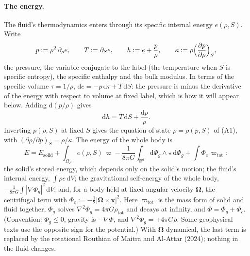 \documentclass[11pt]{article}
\theoremstyle{definition}
\theoremstyle{remark}
\newcommand{\R}{\mathbb{R}}
\newcommand{\bx}{\mathbf{x}}
\newcommand{\bOmega}{\boldsymbol{\Omega}}
\newcommand{\dV}{\,\mathrm{d}V}
\begin{document}
\paragraph{The energy.} The fluid's thermodynamics enters through its
specific internal energy $e(\rho, S)$. Write
\begin{equation}
  p := \rho^2\,\partial_\rho e,\qquad
  T := \partial_S e,\qquad
  h := e + \frac p\rho,\qquad
  \kappa := \rho\Bigl(\frac{\partial p}{\partial\rho}\Bigr)_S ,
  \label{eq:thermo}
\end{equation}
the pressure, the variable conjugate to the label (the temperature
when $S$ is specific entropy), the specific enthalpy and the bulk
modulus. In terms of the specific volume $\tau = 1/\rho$,
$\mathrm de = -p\,\mathrm d\tau + T\,\mathrm dS$: the pressure is
minus the derivative of the energy with respect to volume at fixed
label, which is how it will appear below. Adding $\mathrm d(p/\rho)$
gives
\begin{equation}
  \mathrm dh = T\,\mathrm dS + \frac{\mathrm dp}{\rho} .
  \label{eq:dh}
\end{equation}
Inverting $p(\rho, S)$ at fixed $S$ gives the equation of state $\rho
= \rho(p, S)$ of (A1), with $(\partial\rho/\partial p)_S =
\rho/\kappa$. The energy of the whole body is
\begin{equation}
  E = E_{\mathrm{solid}} + \int_{\Omega_F}e(\rho, S)\,\varpi
  - \frac{1}{8\pi G}\int_{\R^d}\mathrm d\Phi_g\wedge\star\,\mathrm d\Phi_g
  + \int\Phi_c\,\varpi_{\mathrm{tot}} :
  \label{eq:energy}
\end{equation}
the solid's stored energy, which depends only on the solid's motion;
the fluid's internal energy, $\int\rho e\dV$; the gravitational
self-energy of the whole body, $-\tfrac{1}{8\pi G}\int|\nabla\Phi_g|^2
\dV$; and, for a body held at fixed angular velocity $\bOmega$, the
centrifugal term with $\Phi_c := -\tfrac12|\bOmega\times\bx|^2$. Here
$\varpi_{\mathrm{tot}}$ is the mass form of solid and fluid together,
$\Phi_g$ solves $\nabla^2\Phi_g = 4\pi G\rho_{\mathrm{tot}}$ and decays
at infinity, and $\Phi = \Phi_g + \Phi_c$. (Convention: $\Phi_g \le 0$,
gravity is $-\nabla\Phi$, and $\nabla^2\Phi_g = +4\pi G\rho$. Some
geophysical texts use the opposite sign for the potential.) With
$\bOmega$ dynamical, the last term is replaced by the rotational
Routhian of Maitra and Al-Attar (2024); nothing in the fluid changes.
\end{document}
